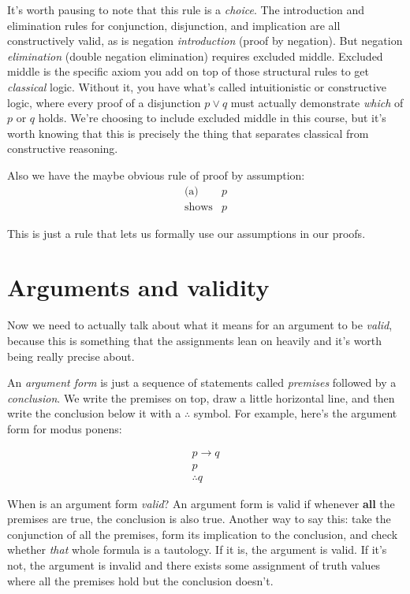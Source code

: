 \documentclass[11pt]{article}
\begin{document}
It's worth pausing to note that this rule is a \emph{choice}. The introduction and elimination rules for conjunction, disjunction, and implication are all constructively valid, as is negation \emph{introduction} (proof by negation). But negation \emph{elimination} (double negation elimination) requires excluded middle. Excluded middle is the specific axiom you add on top of those structural rules to get \emph{classical} logic. Without it, you have what's called intuitionistic or constructive logic, where every proof of a disjunction $p \vee q$ must actually demonstrate \emph{which} of $p$ or $q$ holds. We're choosing to include excluded middle in this course, but it's worth knowing that this is precisely the thing that separates classical from constructive reasoning.

Also we have the maybe obvious rule of proof by assumption:
\[
  \begin{array}{rl}
    \text{(a)} & p \\
    \hline
    \text{shows} & p
  \end{array}
\]

This is just a rule that lets us formally use our assumptions in our proofs.

\section{Arguments and validity}

Now we need to actually talk about what it means for an argument to be \emph{valid}, because this is something that the assignments lean on heavily and it's worth being really precise about.

An \emph{argument form} is just a sequence of statements called \emph{premises} followed by a \emph{conclusion}. We write the premises on top, draw a little horizontal line, and then write the conclusion below it with a $\therefore$ symbol. For example, here's the argument form for modus ponens:

\[
  \begin{array}{c}
    p \to q \\
    p \\
    \hline
    \therefore q
  \end{array}
\]

When is an argument form \emph{valid}? An argument form is valid if whenever \textbf{all} the premises are true, the conclusion is also true. Another way to say this: take the conjunction of all the premises, form its implication to the conclusion, and check whether \emph{that} whole formula is a tautology. If it is, the argument is valid. If it's not, the argument is invalid and there exists some assignment of truth values where all the premises hold but the conclusion doesn't.
\end{document}
